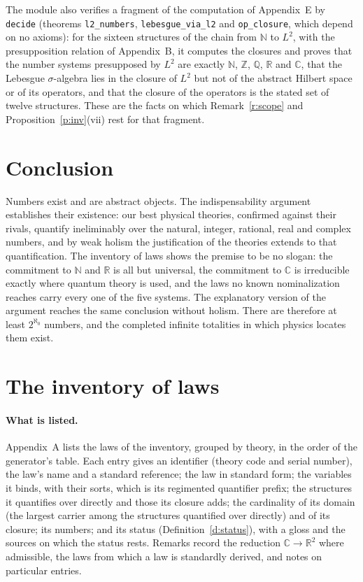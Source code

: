 \documentclass{situationist-preprint}
\begin{document}
The module also verifies a fragment of the computation of Appendix~E by \texttt{decide} (theorems \texttt{l2\_numbers}, \texttt{lebesgue\_via\_l2} and \texttt{op\_closure}, which depend on no axioms): for the sixteen structures of the chain from $\mathbb N$ to $L^2$, with the presupposition relation of Appendix~B, it computes the closures and proves that the number systems presupposed by $L^2$ are exactly $\mathbb N$, $\mathbb Z$, $\mathbb Q$, $\mathbb R$ and $\mathbb C$, that the Lebesgue $\sigma$-algebra lies in the closure of $L^2$ but not of the abstract Hilbert space or of its operators, and that the closure of the operators is the stated set of twelve structures. These are the facts on which Remark~\ref{r:scope} and Proposition~\ref{p:inv}(vii) rest for that fragment.

\section{Conclusion}\label{s:concl}

Numbers exist and are abstract objects. The indispensability argument establishes their existence: our best physical theories, confirmed against their rivals, quantify ineliminably over the natural, integer, rational, real and complex numbers, and by weak holism the justification of the theories extends to that quantification. The inventory of \nLaws{} laws shows the premise to be no slogan: the commitment to $\mathbb N$ and $\mathbb R$ is all but universal, the commitment to $\mathbb C$ is irreducible exactly where quantum theory is used, and the laws no known nominalization reaches carry every one of the five systems. The explanatory version of the argument reaches the same conclusion without holism. There are therefore at least $2^{\aleph_0}$ numbers, and the completed infinite totalities in which physics locates them exist.

\appendix

\section{The inventory of laws}\label{app:a}

\paragraph{What is listed.} Appendix~A lists the \nLaws{} laws of the inventory, grouped by theory, in the order of the generator's table. Each entry gives an identifier (theory code and serial number), the law's name and a standard reference; the law in standard form; the variables it binds, with their sorts, which is its regimented quantifier prefix; the structures it quantifies over directly and those its closure adds; the cardinality of its domain (the largest carrier among the structures quantified over directly) and of its closure; its numbers; and its status (Definition~\ref{d:status}), with a gloss and the sources on which the status rests. Remarks record the reduction $\mathbb C \to \mathbb R^2$ where admissible, the laws from which a law is standardly derived, and notes on particular entries.
\end{document}
